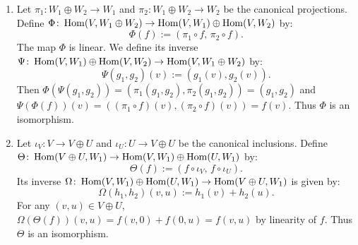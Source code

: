 \begin{exercisesolution}
\label{sol:hom_direct_sum_decompositions}
\begin{enumerate}[label=\textbf{(\alph*)}]
    \item Let $\pi_1 \colon W_1 \oplus W_2 \to W_1$ and $\pi_2 \colon W_1 \oplus W_2 \to W_2$ be the canonical projections.
    Define $\Phi \colon \operatorname{Hom}(V, W_1 \oplus W_2) \to \operatorname{Hom}(V, W_1) \oplus \operatorname{Hom}(V, W_2)$ by:
    \[
    \Phi(f) := (\pi_1 \circ f, \, \pi_2 \circ f).
    \]
    The map $\Phi$ is linear. We define its inverse $\Psi \colon \operatorname{Hom}(V, W_1) \oplus \operatorname{Hom}(V, W_2) \to \operatorname{Hom}(V, W_1 \oplus W_2)$ by:
    \[
    \Psi(g_1, g_2)(v) := (g_1(v), g_2(v)).
    \]
    Then $\Phi(\Psi(g_1, g_2)) = (\pi_1(g_1, g_2), \pi_2(g_1, g_2)) = (g_1, g_2)$ and $\Psi(\Phi(f))(v) = ((\pi_1 \circ f)(v), (\pi_2 \circ f)(v)) = f(v)$.
    Thus $\Phi$ is an isomorphism.

    \item Let $\iota_V \colon V \to V \oplus U$ and $\iota_U \colon U \to V \oplus U$ be the canonical inclusions.
    Define $\Theta \colon \operatorname{Hom}(V \oplus U, W_1) \to \operatorname{Hom}(V, W_1) \oplus \operatorname{Hom}(U, W_1)$ by:
    \[
    \Theta(f) := (f \circ \iota_V, \, f \circ \iota_U).
    \]
    Its inverse $\Omega \colon \operatorname{Hom}(V, W_1) \oplus \operatorname{Hom}(U, W_1) \to \operatorname{Hom}(V \oplus U, W_1)$ is given by:
    \[
    \Omega(h_1, h_2)(v, u) := h_1(v) + h_2(u).
    \]
    For any $(v, u) \in V \oplus U$, $\Omega(\Theta(f))(v, u) = f(v, 0) + f(0, u) = f(v, u)$ by linearity of $f$.
    Thus $\Theta$ is an isomorphism. \qedhere
\end{enumerate}
\end{exercisesolution}


